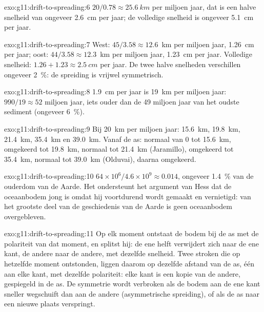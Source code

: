 \begin{solution}{exo:g11:drift-to-spreading:6}
$20/0.78 \approx \qty{25.6}{km}$ per miljoen jaar, dat is een halve snelheid van
ongeveer \qty{2.6}{cm} per jaar; de volledige snelheid is ongeveer \qty{5.1}{cm}
per jaar.
\end{solution}

\begin{solution}{exo:g11:drift-to-spreading:7}
West: $45/3.58 \approx 12.6$~km per miljoen jaar, \qty{1.26}{cm} per jaar;
oost: $44/3.58 \approx 12.3$~km per miljoen jaar, \qty{1.23}{cm} per jaar.
Volledige snelheid: $1.26 + 1.23 \approx \qty{2.5}{cm}$ per jaar. De twee halve
snelheden verschillen ongeveer \qty{2}{\percent}: de spreiding is vrijwel
symmetrisch.
\end{solution}

\begin{solution}{exo:g11:drift-to-spreading:8}
\qty{1.9}{cm} per jaar is \qty{19}{km} per miljoen jaar: $990/19 \approx 52$
miljoen jaar, iets ouder dan de 49 miljoen jaar van het oudste sediment
(ongeveer \qty{6}{\percent}).
\end{solution}

\begin{solution}{exo:g11:drift-to-spreading:9}
Bij \qty{20}{km} per miljoen jaar: \qty{15.6}{km}, \qty{19.8}{km},
\qty{21.4}{km}, \qty{35.4}{km} en \qty{39.0}{km}. Vanaf de as: normaal van 0
tot \qty{15.6}{km}, omgekeerd tot \qty{19.8}{km}, normaal tot \qty{21.4}{km}
(Jaramillo), omgekeerd tot \qty{35.4}{km}, normaal tot \qty{39.0}{km} (Olduvai),
daarna omgekeerd.
\end{solution}

\begin{solution}{exo:g11:drift-to-spreading:10}
$64 \times 10^6/4.6 \times 10^9 \approx \num{0.014}$, ongeveer
\qty{1.4}{\percent} van de ouderdom van de Aarde. Het ondersteunt het argument
van Hess dat de oceaanbodem jong is omdat hij voortdurend wordt gemaakt en
vernietigd: van het grootste deel van de geschiedenis van de Aarde is geen
oceaanbodem overgebleven.
\end{solution}

\begin{solution}{exo:g11:drift-to-spreading:11}
Op elk moment ontstaat de bodem bij de as met de polariteit van dat moment, en
splitst hij: de ene helft verwijdert zich naar de ene kant, de andere naar de
andere, met dezelfde snelheid. Twee stroken die op hetzelfde moment ontstonden,
liggen daarom op dezelfde afstand van de as, één aan elke kant, met dezelfde
polariteit: elke kant is een kopie van de andere, gespiegeld in de as. De
symmetrie wordt verbroken als de bodem aan de ene kant sneller wegschuift dan aan
de andere (asymmetrische spreiding), of als de as naar een nieuwe plaats
verspringt.
\end{solution}

